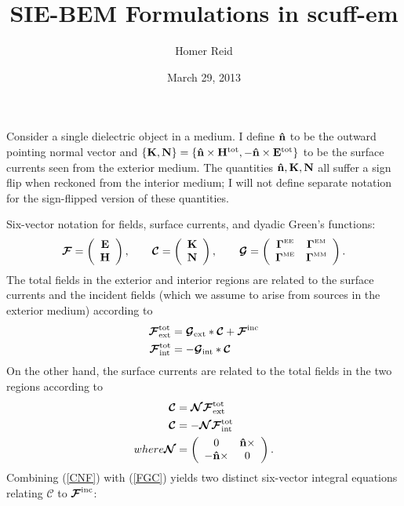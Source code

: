 \documentclass[letterpaper]{article}
\title {SIE-BEM Formulations in {\sc scuff-em}}
\author {Homer Reid}
\date {March 29, 2013}
\newcommand{\FSV}{\boldsymbol{\mathcal{F}}}   %
\newcommand{\CSV}{\boldsymbol{\mathcal{C}}}   %
\newcommand{\NM}{\boldsymbol{\mathcal{N}}}
\newcommand{\SVDGF}{\boldsymbol{\mathcal{G}}} %
\begin{document}
\pagestyle{myheadings}
\maketitle

\tableofcontents

Consider a single dielectric object in a medium.   
I define $\mathbf{\hat n}$ to be the outward pointing normal vector
and $\{\mathbf{K}, \mathbf{N}\}=
\{\mathbf{\hat n}\times \mathbf{H}^{\hbox{\scriptsize{tot}}}, -\mathbf{\hat n}\times\mathbf{E}^{\hbox{\scriptsize{tot}}}\}$
to be the surface currents seen from the exterior medium.
The quantities $\mathbf{\hat n}, \mathbf{K}, \mathbf{N}$ all suffer a sign flip
when reckoned from the interior medium; I will not define
separate notation for the sign-flipped version of these
quantities.

Six-vector notation for fields, surface currents, and dyadic Green's
functions:
$$ \FSV=\left(\begin{array}{c} \vb E \\ \vb H \end{array}\right), \qquad
   \CSV=\left(\begin{array}{c} \vb K \\ \vb N \end{array}\right), \qquad
   \SVDGF=\left(\begin{array}{cc} 
      \BG\supt{EE} & \BG\supt{EM}  \\
      \BG\supt{ME} & \BG\supt{MM} 
          \end{array}\right).
$$
The total fields in the exterior and interior regions are related
to the surface currents and the incident fields (which we assume
to arise from sources in the exterior medium) according to
\begin{subequations}
\begin{align}
 \FSV\subs{ext}\sups{tot} &= \SVDGF\subs{ext} * \CSV + \FSV\sups{inc} \\
 \FSV\subs{int}\sups{tot} &= -\SVDGF\subs{int} * \CSV
\end{align}
\label{FGC}
\end{subequations}
On the other hand, the surface currents are related to the 
total fields in the two regions according to
\begin{subequations}
\begin{align}
 \CSV &=  \NM\FSV\sups{tot}\subs{ext}
\\
 \CSV &= -\NM\FSV\sups{tot}\subs{int}
\\
 where 
 \NM &=
   \left(\begin{array}{cc} 
   0               & \vbhat{n}\times \\
  -\vbhat{n}\times & 0
   \end{array} \right).
\end{align}
\label{CNF}
\end{subequations}
%
Combining (\ref{CNF}) with (\ref{FGC}) yields 
two distinct six-vector integral equations
relating $\CSV$ to $\FSV\sups{inc}$:
\begin{subequations}
\begin{align}
\end{align}
\end{subequations}
\end{document}
